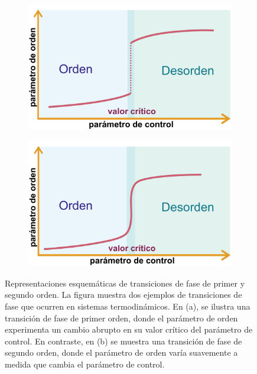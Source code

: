 \begin{figure}[h!]
	\centering
	\begin{subfigure}[b]{0.45\textwidth}
		\centering
		\includegraphics[width=\textwidth]{transiciones_fases_tipo_I.pdf}
		\caption{}
		\label{fig:transicionI}
	\end{subfigure}
	\begin{subfigure}[b]{0.45\textwidth}
		\centering
		\includegraphics[width=\textwidth]{transiciones_fases_tipo_II.pdf}
		\caption{}
		\label{fig:transicionII}
	\end{subfigure}
	\caption[Representaciones esquemáticas de transiciones de fase de primer y segundo orden.]{Representaciones esquemáticas de transiciones de fase de primer y segundo orden. La figura muestra dos ejemplos de transiciones de fase que ocurren en sistemas termodinámicos. En (a), se ilustra una transición de fase de primer orden, donde el parámetro de orden experimenta un cambio abrupto en su valor crítico del parámetro de control. En contraste, en (b) se muestra una transición de fase de segundo orden, donde el parámetro de orden varía suavemente a medida que cambia el parámetro de control.}
	\label{fig:trancisiones}
\end{figure}


